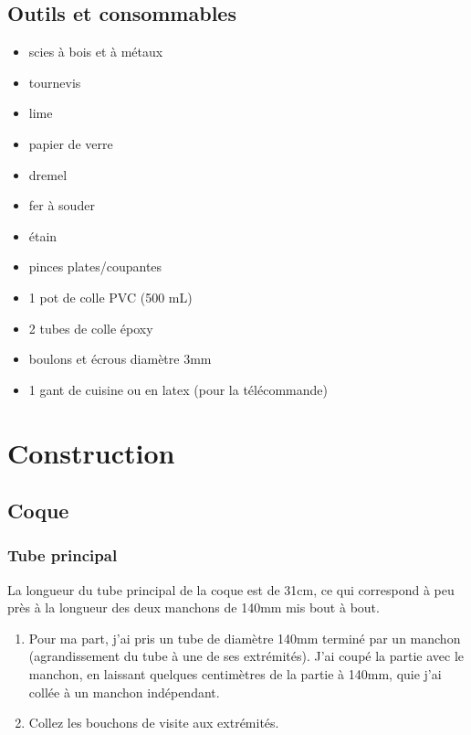 \documentclass[11pt,a4paper]{article}
\begin{document}
    \subsection{Outils et consommables}
      \begin{itemize}
        \setlength\itemsep{-2mm}
        \item scies à bois et à métaux
        \item tournevis
        \item lime
        \item papier de verre
        \item dremel
        \item fer à souder
        \item étain
        \item pinces plates/coupantes
        \item 1 pot de colle PVC (500 mL)
        \item 2 tubes de colle époxy
        \item boulons et écrous diamètre 3mm
        \item 1 gant de cuisine ou en latex (pour la télécommande)
      \end{itemize}


    \section{Construction}
      \subsection{Coque}
        
        \subsubsection{Tube principal}
          La longueur du tube principal de la coque est de 31cm, ce qui correspond à peu près à la longueur des deux manchons de 140mm mis bout à bout.
          \begin{enumerate}
            \item Pour ma part, j'ai pris un tube de diamètre 140mm terminé par un manchon (agrandissement du tube à une de ses extrémités). J'ai coupé la partie avec le manchon, en laissant quelques centimètres de la partie à 140mm, quie j'ai collée à un manchon indépendant.
            
            \item Collez les bouchons de visite aux extrémités.
          \end{enumerate}
          
\end{document}
